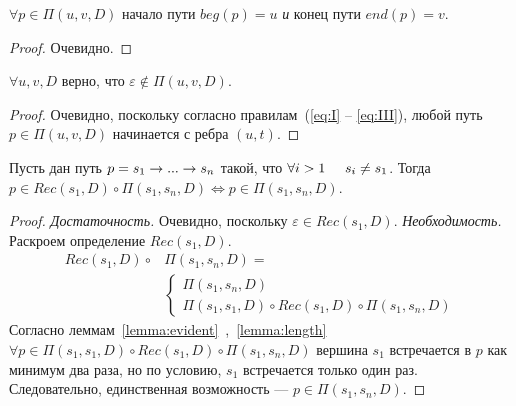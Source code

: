 \begin{lm}
\label{lemma:evident}
$\forall p \in \Pi(u,v,D)$ начало пути $beg(p) = u$ \emph{и} конец пути $end(p) = v$.
\end{lm}
\begin{proof}
Очевидно.
\end{proof}

\begin{lm}
\label{lemma:length}
$\forall u,v,D$ верно, что $\varepsilon \notin \Pi(u,v,D)$.
\end{lm}
\begin{proof}
Очевидно, поскольку согласно правилам~(\ref{eq:I} -- \ref{eq:III}), любой путь $p \in \Pi(u,v,D)$ начинается с ребра $(u,t)$.
\end{proof}

\begin{lm}
\label{lemma:reduction}
Пусть дан путь $p = s_1 \rightarrow ... \rightarrow s_n$ такой, что $\forall i > 1 \hspace{5mm} s_i \neq s_1$.
Тогда $p \in Rec(s_1,D) \circ \Pi(s_1, s_n, D) \iff p \in \Pi(s_1,s_n,D)$.
\end{lm}

\begin{proof}
\emph{Достаточность.} Очевидно, поскольку $\varepsilon \in Rec(s_1,D)$.
\emph{Необходимость.} Раскроем определение $Rec(s_1,D)$.
\begin{equation}
    \begin{aligned}
    Rec(s_1,D) \circ & \Pi(s_1,s_n,D) = \\ 
                     & \begin{cases} 
            \Pi(s_1,s_n,D) \\
            \Pi(s_1,s_1,D) \circ Rec(s_1,D) \circ \Pi(s_1, s_n,D)
            \end{cases}
    \end{aligned}
\end{equation}
Согласно леммам~\ref{lemma:evident}~,~\ref{lemma:length} $\forall p \in \Pi(s_1, s_1,D) \circ Rec(s_1,D) \circ \Pi(s_1, s_n,D)$
вершина $s_1$ встречается в $p$ как минимум два раза, но по условию, $s_1$ встречается только один раз.
Следовательно, единственная возможность --- $p \in \Pi(s_1,s_n,D)$.
\end{proof}

